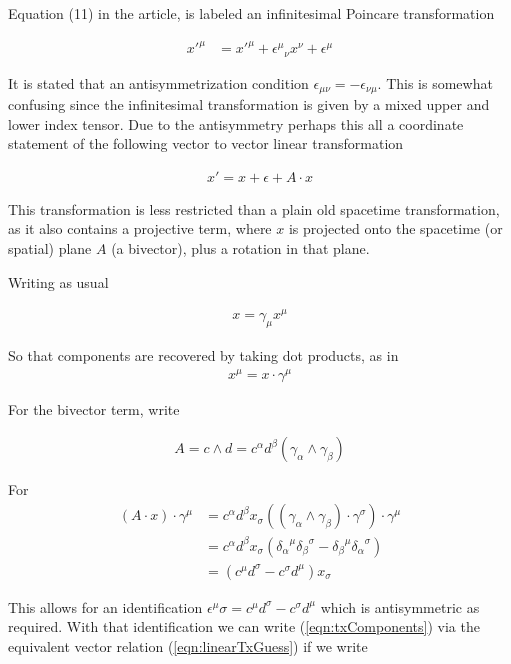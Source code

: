 Equation (11) in the article, is labeled an infinitesimal Poincare
transformation

\begin{align}\label{eqn:txComponents}
{x'}^\mu
&=
{x'}^\mu
+ {{\epsilon}^\mu}_\nu x^\nu
+ {\epsilon}^\mu
\end{align}

It is stated that an antisymmetrization condition $\epsilon_{\mu\nu} = -\epsilon_{\nu\mu}$.  This is somewhat confusing 
since the infinitesimal transformation is given by a mixed upper and lower index tensor.   Due to the antisymmetry
perhaps this all a coordinate statement of the following vector to vector linear transformation

\begin{align}\label{eqn:linearTxGuess}
x' = x + \epsilon + A \cdot x
\end{align}

This transformation is less restricted than a plain old spacetime transformation, as it also contains a projective term, where $x$ is projected onto the spacetime (or spatial) plane $A$ (a bivector), plus a rotation in that plane.

Writing as usual

\begin{align*}
x = \gamma_\mu x^\mu
\end{align*}

So that components are recovered by taking dot products, as in
\begin{align*}
x^\mu = x \cdot \gamma^\mu
\end{align*}

For the bivector term, write

\begin{align*}
A = c \wedge d = c^\alpha d^\beta (\gamma_\alpha \wedge \gamma_\beta)
\end{align*}

For
\begin{align*}
(A \cdot x ) \cdot \gamma^\mu 
&=
c^\alpha d^\beta x_\sigma ((\gamma_\alpha \wedge \gamma_\beta) \cdot \gamma^\sigma) \cdot \gamma^\mu \\
&=
c^\alpha d^\beta x_\sigma ( {\delta_\alpha}^\mu {\delta_\beta}^\sigma -{\delta_\beta}^\mu {\delta_\alpha}^\sigma ) \\
&=
(c^\mu d^\sigma -c^\sigma d^\mu ) x_\sigma 
\end{align*}

This allows for an identification $\epsilon^\mu\sigma = c^\mu d^\sigma -c^\sigma d^\mu$ which is antisymmetric as required.
With that identification we can write (\ref{eqn:txComponents}) via the equivalent vector relation (\ref{eqn:linearTxGuess}) if
we write

